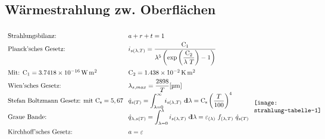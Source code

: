 \subsection{Wärmestrahlung zw. Oberflächen}
	\setlength{\abovedisplayskip}{-15pt}
	\[ \arraycolsep=0.4em  \def\arraystretch{1.7}
	\begin{array}{llc}
		\text{Strahlungsbilanz:}                          & a + r + t  =  1                                                                                                                                                                                     & \multirow{12}{2.6cm}{\texttt{[image: strahlung-tabelle-1]}} \\
		\text{Planck'sches Gesetz:}                       & i_{s(\lambda,T)}  =  \dfrac{\Cone}{\lambda^5\left(\exp\left( \dfrac{\Ctwo}{\lambda\ T} \right) - 1\right)}                                                                                          &                                                                               \\
		\text{Mit: } \Cone=\qty{3,7418e-16}{\W\m\squared} & \Ctwo = \qty{1,438e-2}{\K\m\squared}                                                                                                                                                                &                                                                               \\
		\text{Wien'sches Gesetz:}                         & \lambda_{s,max}  =  \dfrac{2898}{T}  [\unit{\micro\m}]                                                                                                                                              &                                                                               \\
		\text{Stefan Boltzmann Gesetz: mit }\Cs  =  5,67  & \dot{q}_{s(T)}  =  \displaystyle\int_{\lambda = 0}^{\infty} i_{s(\lambda,T)} \ \dd \lambda  =  \Cs \left(\dfrac{T}{100}\right)^4                                                                    &                                                                               \\
		\text{Graue Bande:}                               & \dot{q}_{\lambda,s(T)}  =  \displaystyle\int_{\lambda = 0}^{\lambda} i_{s(\lambda,T)} \ \dd \lambda  = \varepsilon_{(\lambda)}\  f_{(\lambda,T)}\ \dot{q}_{s(T)}                                    &                                                                               \\
		\text{Kirchhoff'sches Gesetz:}                    & a = \varepsilon                                                                                                                                                                                     &                                                                               \\

\end{array}\]
